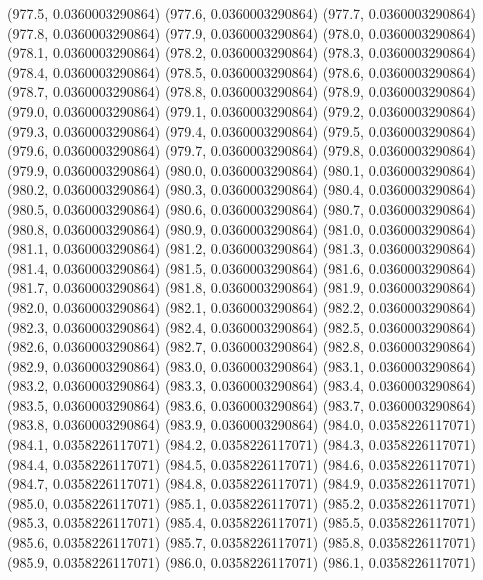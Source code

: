 {					(977.5, 0.0360003290864)
					(977.6, 0.0360003290864)
					(977.7, 0.0360003290864)
					(977.8, 0.0360003290864)
					(977.9, 0.0360003290864)
					(978.0, 0.0360003290864)
					(978.1, 0.0360003290864)
					(978.2, 0.0360003290864)
					(978.3, 0.0360003290864)
					(978.4, 0.0360003290864)
					(978.5, 0.0360003290864)
					(978.6, 0.0360003290864)
					(978.7, 0.0360003290864)
					(978.8, 0.0360003290864)
					(978.9, 0.0360003290864)
					(979.0, 0.0360003290864)
					(979.1, 0.0360003290864)
					(979.2, 0.0360003290864)
					(979.3, 0.0360003290864)
					(979.4, 0.0360003290864)
					(979.5, 0.0360003290864)
					(979.6, 0.0360003290864)
					(979.7, 0.0360003290864)
					(979.8, 0.0360003290864)
					(979.9, 0.0360003290864)
					(980.0, 0.0360003290864)
					(980.1, 0.0360003290864)
					(980.2, 0.0360003290864)
					(980.3, 0.0360003290864)
					(980.4, 0.0360003290864)
					(980.5, 0.0360003290864)
					(980.6, 0.0360003290864)
					(980.7, 0.0360003290864)
					(980.8, 0.0360003290864)
					(980.9, 0.0360003290864)
					(981.0, 0.0360003290864)
					(981.1, 0.0360003290864)
					(981.2, 0.0360003290864)
					(981.3, 0.0360003290864)
					(981.4, 0.0360003290864)
					(981.5, 0.0360003290864)
					(981.6, 0.0360003290864)
					(981.7, 0.0360003290864)
					(981.8, 0.0360003290864)
					(981.9, 0.0360003290864)
					(982.0, 0.0360003290864)
					(982.1, 0.0360003290864)
					(982.2, 0.0360003290864)
					(982.3, 0.0360003290864)
					(982.4, 0.0360003290864)
					(982.5, 0.0360003290864)
					(982.6, 0.0360003290864)
					(982.7, 0.0360003290864)
					(982.8, 0.0360003290864)
					(982.9, 0.0360003290864)
					(983.0, 0.0360003290864)
					(983.1, 0.0360003290864)
					(983.2, 0.0360003290864)
					(983.3, 0.0360003290864)
					(983.4, 0.0360003290864)
					(983.5, 0.0360003290864)
					(983.6, 0.0360003290864)
					(983.7, 0.0360003290864)
					(983.8, 0.0360003290864)
					(983.9, 0.0360003290864)
					(984.0, 0.0358226117071)
					(984.1, 0.0358226117071)
					(984.2, 0.0358226117071)
					(984.3, 0.0358226117071)
					(984.4, 0.0358226117071)
					(984.5, 0.0358226117071)
					(984.6, 0.0358226117071)
					(984.7, 0.0358226117071)
					(984.8, 0.0358226117071)
					(984.9, 0.0358226117071)
					(985.0, 0.0358226117071)
					(985.1, 0.0358226117071)
					(985.2, 0.0358226117071)
					(985.3, 0.0358226117071)
					(985.4, 0.0358226117071)
					(985.5, 0.0358226117071)
					(985.6, 0.0358226117071)
					(985.7, 0.0358226117071)
					(985.8, 0.0358226117071)
					(985.9, 0.0358226117071)
					(986.0, 0.0358226117071)
					(986.1, 0.0358226117071)
}
